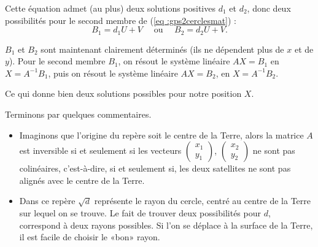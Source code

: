 \documentclass[class=report,crop=false]{standalone}
\begin{document}
Cette équation admet (au plus) deux solutions positives $d_1$ et $d_2$, donc deux possibilités pour
le second membre de (\ref{eq :gps2cerclesmat}) :
$$B_1 = d_1U+V \quad \text{ ou } \quad B_2 = d_2U+V.$$

$B_1$ et $B_2$ sont maintenant clairement déterminés (ils ne dépendent plus de $x$ et de $y$).
Pour le second membre $B_1$, on résout le système linéaire
$AX=B_1$ en $X = A^{-1}B_1$, puis
on résout le système linéaire $AX=B_2$, en $X = A^{-1}B_2$.

Ce qui donne bien deux solutions possibles pour notre position $X$.



\bigskip

Terminons par quelques commentaires.


\begin{itemize}
  \item Imaginons que l'origine du repère soit le centre de la Terre, 
  alors la matrice $A$ est inversible si et seulement si les vecteurs
  $\begin{pmatrix}x_1\\y_1\end{pmatrix}$, $\begin{pmatrix}x_2\\y_2\end{pmatrix}$ 
  ne sont pas colinéaires, c'est-à-dire, si et seulement si,
  les deux satellites ne sont pas alignés avec le centre de la Terre.
  
  
  \item  Dans ce repère $\sqrt d$ représente le rayon du cercle, centré au centre
  de la Terre sur lequel on se trouve. Le fait de trouver deux possibilités pour $d$,
  correspond à deux rayons possibles. Si l'on se déplace à la surface de la Terre, 
  il est facile de choisir le «bon» rayon.
  
\end{itemize}
\end{document}
